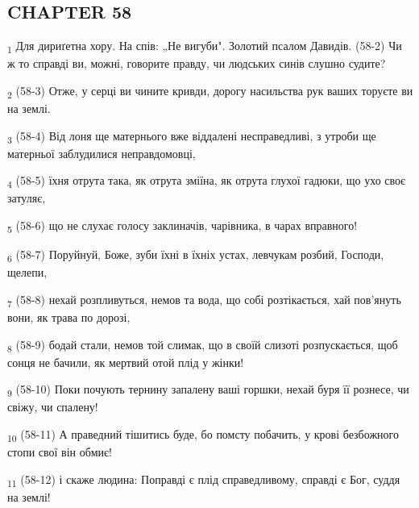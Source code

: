 \subsection{CHAPTER 58}
\begin{tcolorbox}
\textsubscript{1} Для дириґетна хору. На спів: „Не вигуби". Золотий псалом Давидів. (58-2) Чи ж то справді ви, можні, говорите правду, чи людських синів слушно судите?
\end{tcolorbox}
\begin{tcolorbox}
\textsubscript{2} (58-3) Отже, у серці ви чините кривди, дорогу насильства рук ваших торуєте ви на землі.
\end{tcolorbox}
\begin{tcolorbox}
\textsubscript{3} (58-4) Від лоня ще матернього вже віддалені несправедливі, з утроби ще матерньої заблудилися неправдомовці,
\end{tcolorbox}
\begin{tcolorbox}
\textsubscript{4} (58-5) їхня отрута така, як отрута зміїна, як отрута глухої гадюки, що ухо своє затуляє,
\end{tcolorbox}
\begin{tcolorbox}
\textsubscript{5} (58-6) що не слухає голосу заклиначів, чарівника, в чарах вправного!
\end{tcolorbox}
\begin{tcolorbox}
\textsubscript{6} (58-7) Поруйнуй, Боже, зуби їхні в їхніх устах, левчукам розбий, Господи, щелепи,
\end{tcolorbox}
\begin{tcolorbox}
\textsubscript{7} (58-8) нехай розпливуться, немов та вода, що собі розтікається, хай пов'януть вони, як трава по дорозі,
\end{tcolorbox}
\begin{tcolorbox}
\textsubscript{8} (58-9) бодай стали, немов той слимак, що в своїй слизоті розпускається, щоб сонця не бачили, як мертвий отой плід у жінки!
\end{tcolorbox}
\begin{tcolorbox}
\textsubscript{9} (58-10) Поки почують тернину запалену ваші горшки, нехай буря її рознесе, чи свіжу, чи спалену!
\end{tcolorbox}
\begin{tcolorbox}
\textsubscript{10} (58-11) А праведний тішитись буде, бо помсту побачить, у крові безбожного стопи свої він обмиє!
\end{tcolorbox}
\begin{tcolorbox}
\textsubscript{11} (58-12) і скаже людина: Поправді є плід справедливому, справді є Бог, суддя на землі!
\end{tcolorbox}

